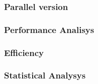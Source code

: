  

\subsubsection*{Parallel version}
\subsubsection*{Performance Analisys} 
\subsubsection*{Efficiency} 
\subsubsection*{Statistical Analysys}
